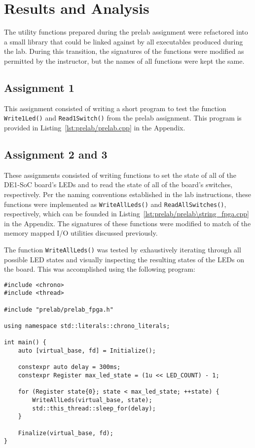 \documentclass[11pt, letterpaper]{article} %
\begin{document}
\section*{Results and Analysis}

The utility functions prepared during the prelab assignment were refactored into a small library that could be linked against by all executables produced during the lab. During this transition, the signatures of the functions were modified as permitted by the instructor, but the names of all functions were kept the same.

\subsection*{Assignment 1}

This assignment consisted of writing a short program to test the function \texttt{Write1Led()} and \texttt{Read1Switch()} from the prelab assignment. This program is provided in Listing~\ref{lst:prelab/prelab.cpp} in the Appendix.

\subsection*{Assignment 2 and 3}

These assignments consisted of writing functions to set the state of all of the DE1-SoC board's LEDs and to read the state of all of the board's switches, respectively. Per the naming conventions established in the lab instructions, these functions were implemented as \texttt{WriteAllLeds()} and \texttt{ReadAllSwitches()}, respectively, which can be founded in Listing~\ref{lst:prelab/prelab\string_fpga.cpp} in the Appendix. The signatures of these functions were modified to match  of the memory mapped I/O utilities discussed previously.

The function \texttt{WriteAllLeds()} was tested by exhaustively iterating through all possible LED states and visually inspecting the resulting states of the LEDs on the board. This was accomplished using the following program:
\begin{lstlisting}[style=labreportstyle-c++]
#include <chrono>
#include <thread>

#include "prelab/prelab_fpga.h"

using namespace std::literals::chrono_literals;

int main() {
    auto [virtual_base, fd] = Initialize();

    constexpr auto delay = 300ms;
    constexpr Register max_led_state = (1u << LED_COUNT) - 1;
    
    for (Register state{0}; state < max_led_state; ++state) {
        WriteAllLeds(virtual_base, state);
        std::this_thread::sleep_for(delay);
    }
    
    Finalize(virtual_base, fd);
}
\end{lstlisting}
\end{document}
